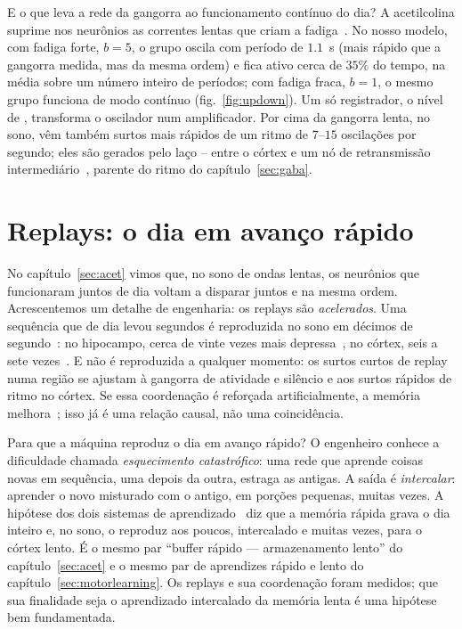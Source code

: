 E o que leva a rede da gangorra ao funcionamento contínuo do dia? A acetilcolina suprime nos neurônios as correntes lentas que criam a fadiga~\cite{McCormick1992}. No nosso modelo, com fadiga forte, $b=5$, o grupo oscila com período de $1.1$~s (mais rápido que a gangorra medida, mas da mesma ordem) e fica ativo cerca de $35\%$ do tempo, na média sobre um número inteiro de períodos; com fadiga fraca, $b=1$, o mesmo grupo funciona de modo contínuo (fig.~\ref{fig:updown}). Um só registrador, o nível de , transforma o oscilador num amplificador. Por cima da gangorra lenta, no sono, vêm também surtos mais rápidos de um ritmo de $7$--$15$ oscilações por segundo; eles são gerados pelo laço -- entre o córtex e um nó de retransmissão intermediário~\cite{SteriadeMcCormickSejnowski1993}, parente do ritmo do capítulo~\ref{sec:gaba}.

\section{Replays: o dia em avanço rápido}

No capítulo~\ref{sec:acet} vimos que, no sono de ondas lentas, os neurônios que funcionaram juntos de dia voltam a disparar juntos e na mesma ordem. Acrescentemos um detalhe de engenharia: os replays são \emph{acelerados}. Uma sequência que de dia levou segundos é reproduzida no sono em décimos de segundo~\cite{Nadasdy1999}: no hipocampo, cerca de vinte vezes mais depressa~\cite{LeeWilson2002}, no córtex, seis a sete vezes~\cite{Euston2007}. E não é reproduzida a qualquer momento: os surtos curtos de replay numa região se ajustam à gangorra de atividade e silêncio e aos surtos rápidos de ritmo no córtex. Se essa coordenação é reforçada artificialmente, a memória melhora~\cite{Maingret2016}; isso já é uma relação causal, não uma coincidência.

Para que a máquina reproduz o dia em avanço rápido? O engenheiro conhece a dificuldade chamada \emph{esquecimento catastrófico}: uma rede que aprende coisas novas em sequência, uma depois da outra, estraga as antigas. A saída é \emph{intercalar}: aprender o novo misturado com o antigo, em porções pequenas, muitas vezes. A hipótese dos dois sistemas de aprendizado~\cite{McClelland1995} diz que a memória rápida grava o dia inteiro e, no sono, o reproduz aos poucos, intercalado e muitas vezes, para o córtex lento. É o mesmo par ``buffer rápido --- armazenamento lento'' do capítulo~\ref{sec:acet} e o mesmo par de aprendizes rápido e lento do capítulo~\ref{sec:motorlearning}. Os replays e sua coordenação foram medidos; que sua finalidade seja o aprendizado intercalado da memória lenta é uma hipótese bem fundamentada.

